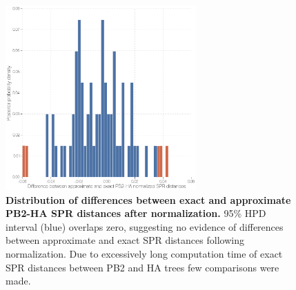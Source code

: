 \documentclass[11pt,oneside,letterpaper]{article}
\begin{document}
\begin{figure}
\centering  
\includegraphics[width=0.65\textwidth]  {supp_figures/InfB_supp_NormPB2-HA_hist.png}
\caption{\textbf{Distribution of differences between exact and approximate PB2-HA SPR distances after normalization.}
95\% HPD interval (blue) overlaps zero, suggesting no evidence of differences between approximate and exact SPR distances following normalization.
Due to excessively long computation time of exact SPR distances between PB2 and HA trees few comparisons were made.}
\label{NormSPR_PB2-HA_difference}
\end{figure}

\end{document}
